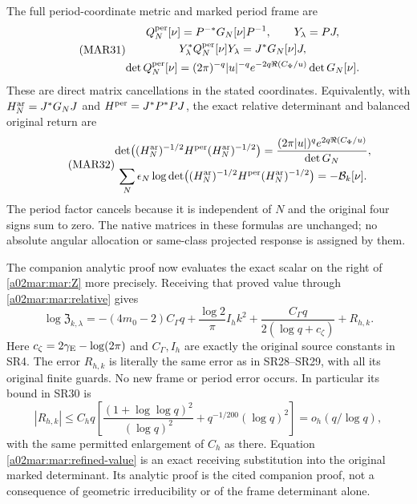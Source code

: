 \documentclass[11pt,a4paper]{article}
\begin{document}
The full period-coordinate metric and marked period frame are
\begin{equation}\tag{MAR31}\label{a02mar:mar:periodmetric}
 \begin{gathered}
 Q_N^{\rm per}[\nu]=P^{-*}G_N[\nu]P^{-1},\qquad Y_\lambda=PJ,\\
 Y_\lambda^*Q_N^{\rm per}[\nu]Y_\lambda=J^*G_N[\nu]J,\\
 \det Q_N^{\rm per}[\nu]
  =(2\pi)^{-q}|u|^{-q}e^{-2q\Re(C_\Phi/u)}\det G_N[\nu].
 \end{gathered}
\end{equation}
These are direct matrix cancellations in the stated coordinates.
Equivalently, with $H_N^{\rm ar}=J^*G_NJ$ and
$H^{\rm per}=J^*P^*PJ$, the exact relative determinant and
balanced original return are
\begin{equation}\tag{MAR32}\label{a02mar:mar:periodreturn}
 \begin{gathered}
 \det\bigl((H_N^{\rm ar})^{-1/2}H^{\rm per}(H_N^{\rm ar})^{-1/2}\bigr)
 =\frac{(2\pi|u|)^q e^{2q\Re(C_\Phi/u)}}{\det G_N},\\
 \sum_N\epsilon_N\log\det\bigl((H_N^{\rm ar})^{-1/2}
                 H^{\rm per}(H_N^{\rm ar})^{-1/2}\bigr)
              =-\mathcal B_k[\nu].
 \end{gathered}
\end{equation}
The period factor cancels because it is independent of $N$ and
the original four signs sum to zero. The native matrices in
these formulas are unchanged; no absolute angular allocation or
same-class projected response is assigned by them.

The companion analytic proof \cite[SR28--SR30]{a02mar:signed} now evaluates
the exact scalar on the right of \eqref{a02mar:mar:Z} more precisely.
Receiving that proved value through \eqref{a02mar:mar:relative} gives
\begin{equation}\tag{MAR33}\label{a02mar:mar:refined-value}
 \log\mathfrak Z_{k,\lambda}
 =-(4m_0-2)C_\Gamma q+\frac{\log2}{\pi}I_hk^2
       +\frac{C_\Gamma q}{2(\log q+c_\zeta)}+R_{h,k}.
\end{equation}
Here $c_\zeta=2\gamma_{\rm E}-\log(2\pi)$ and $C_\Gamma,I_h$
are exactly the original source constants in SR4. The error
$R_{h,k}$ is literally the same error as in SR28--SR29, with all
its original finite guards. No new frame or period error occurs.
In particular its bound in SR30 is
\[
 |R_{h,k}|\le C_h q\left[
 \frac{(1+\log\log q)^2}{(\log q)^2}
             +q^{-1/200}(\log q)^2\right]=o_h(q/\log q),
\]
with the same permitted enlargement of $C_h$ as there.
Equation \eqref{a02mar:mar:refined-value} is an exact receiving
substitution into the original marked determinant. Its analytic
proof is the cited companion proof, not a consequence of
geometric irreducibility or of the frame determinant alone.
\end{document}
